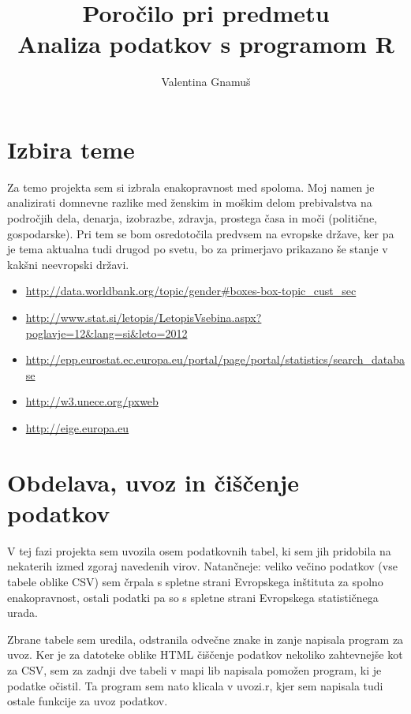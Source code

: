 \documentclass[11pt,a4paper]{article}
\begin{document}
\title{Poročilo pri predmetu \\
Analiza podatkov s programom R}
\author{Valentina Gnamuš}
\maketitle

\section{Izbira teme}
Za temo projekta sem si izbrala enakopravnost med spoloma. Moj namen je analizirati domnevne razlike med ženskim in moškim delom prebivalstva na področjih dela, denarja, izobrazbe, zdravja, prostega časa in moči (politične, gospodarske). Pri tem se bom osredotočila predvsem na evropske države, ker pa je tema aktualna tudi drugod po svetu, bo za primerjavo prikazano še stanje v kakšni neevropski državi.


\begin{itemize}
\item{\url{ http://data.worldbank.org/topic/gender#boxes-box-topic_cust_sec}}
\item{\url{http://www.stat.si/letopis/LetopisVsebina.aspx?poglavje=12&lang=si&leto=2012}}
\item{\url{http://epp.eurostat.ec.europa.eu/portal/page/portal/statistics/search_database}}
\item{\url{http://w3.unece.org/pxweb}}
\item{\url{http://eige.europa.eu}}
\end{itemize}
\section{Obdelava, uvoz in čiščenje podatkov}

V tej fazi projekta sem uvozila osem podatkovnih tabel, ki sem jih pridobila na nekaterih izmed zgoraj navedenih virov. Natančneje: veliko večino podatkov (vse tabele oblike CSV) sem črpala s spletne strani Evropskega inštituta za spolno enakopravnost, ostali podatki pa so s spletne strani Evropskega statističnega urada.

Zbrane tabele sem uredila, odstranila odvečne znake in zanje napisala program za uvoz. 
Ker je za datoteke oblike HTML čiščenje podatkov nekoliko zahtevnejše kot za CSV, sem za zadnji dve tabeli v mapi lib napisala pomožen program, ki je podatke očistil. Ta program sem nato klicala v uvozi.r, kjer sem napisala tudi ostale funkcije za uvoz podatkov.
\end{document}

